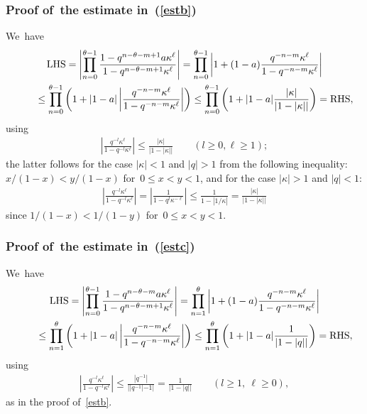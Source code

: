 \documentclass[pdftex]{sigma}%
\numberwithin{equation}{section}
\begin{document}
\subsubsection[Proof of~the estimate in (B.6)]{Proof of~the estimate in~(\ref{estb})}
\label{app:estb}
We~have
\begin{gather*}
\text{LHS} = \left| \prod_{n=0}^{\theta-1} \frac{1- q^{n-\theta-m+1}a\kappa^\ell }{1-q^{n-\theta-m+1} \kappa^\ell } \right| = \prod_{n=0}^{\theta-1}\left| 1+(1-a)\frac{q^{-n-m}\kappa^\ell}{1-q^{-n-m}\kappa^\ell}\right|
\\ \hphantom{\text{LHS}}
{}\leq \prod_{n=0}^{\theta-1}\left( 1+|1-a|\left|\frac{q^{-n-m}\kappa^\ell}{1-q^{-n-m}\kappa^\ell}\right|\right)
\leq \prod_{n=0}^{\theta-1}\left( 1+|1-a|\frac{|\kappa|}{|1-|\kappa||}\right) =\text{RHS},
\end{gather*}
using
\begin{gather*}
\left|\frac{q^{-l}\kappa^\ell}{1-q^{-l}\kappa^\ell}\right|\leq \frac{|\kappa|}{|1-|\kappa||}\qquad
(l\geq 0, \ell\geq 1);
\end{gather*}
the latter follows for the case $|\kappa|<1$ and $|q|>1$ from the following inequality: $x/(1-x)<y/(1-x)$ for~$0\leq x<y<1$, and for the case $|\kappa|>1$ and $|q|<1$:
\begin{gather*}
\left|\frac{q^{-l}\kappa^\ell}{1-q^{-l}\kappa^\ell}\right| = \left|\frac{1}{1-q^{l}\kappa^{-\ell}}\right| \leq \frac1{1-|1/\kappa|} = \frac{|\kappa|}{|1-|\kappa||}
\end{gather*}
since $1/(1-x)<1/(1-y)$ for~$0\leq x<y<1$.

\subsubsection[Proof of~the estimate in (B.7)]{Proof of~the estimate in~(\ref{estc})}
We~have
\begin{gather*}
\text{LHS} = \left| \prod_{n=0}^{\theta-1} \frac{1- q^{n-\theta-m}a\kappa^\ell }{1-q^{n-\theta-m+1} \kappa^\ell } \right| = \prod_{n=1}^{\theta}\left| 1+(1-a)\frac{q^{-n-m}\kappa^\ell}{1-q^{-n-m}\kappa^\ell}\right|
\\ \hphantom{\text{LHS}}
{}\leq \prod_{n=1}^{\theta}\left( 1+|1-a|\left|\frac{q^{-n-m}\kappa^\ell}{1-q^{-n-m}\kappa^\ell}\right|\right)
\leq \prod_{n=1}^{\theta}\left( 1+|1-a|\frac{1}{|1-|q||}\right) =\text{RHS},
\end{gather*}
using
\begin{gather*}
\left|\frac{q^{-l}\kappa^\ell}{1-q^{-l}\kappa^\ell}\right|\leq \frac{|q^{-1}|}{||q^{-1}|-1|} = \frac{1}{|1-|q||} \qquad
(l\geq 1,\ \ell\geq 0),
\end{gather*}
as in the proof of~\eqref{estb}.
\end{document}
